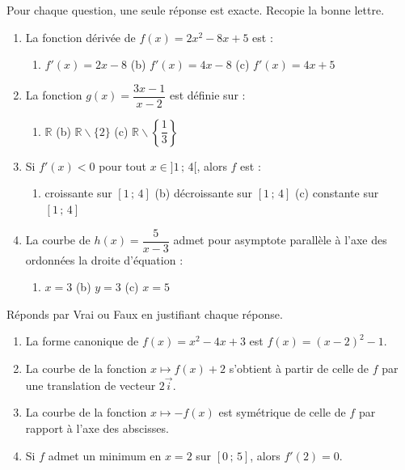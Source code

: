 \documentclass[11pt]{article}
\def\setminus{\mathbin{\backslash}}\let\smallsetminus\setminus
\begin{document}
\begin{exercice}
Pour chaque question, une seule réponse est exacte. Recopie la bonne lettre.
\begin{enumerate}
\item La fonction dérivée de $f(x)=2x^{2}-8x+5$ est :
\begin{enumerate}
\item[(a)] $f'(x)=2x-8$ \quad (b) $f'(x)=4x-8$ \quad (c) $f'(x)=4x+5$
\end{enumerate}
\item La fonction $g(x)=\dfrac{3x-1}{x-2}$ est définie sur :
\begin{enumerate}
\item[(a)] $\mathbb{R}$ \quad (b) $\mathbb{R}\setminus\{2\}$ \quad (c) $\mathbb{R}\setminus\left\{\dfrac{1}{3}\right\}$
\end{enumerate}
\item Si $f'(x)<0$ pour tout $x\in]1\,;\,4[$, alors $f$ est :
\begin{enumerate}
\item[(a)] croissante sur $[1\,;\,4]$ \quad (b) décroissante sur $[1\,;\,4]$ \quad (c) constante sur $[1\,;\,4]$
\end{enumerate}
\item La courbe de $h(x)=\dfrac{5}{x-3}$ admet pour asymptote parallèle à l'axe des ordonnées la droite d'équation :
\begin{enumerate}
\item[(a)] $x=3$ \quad (b) $y=3$ \quad (c) $x=5$
\end{enumerate}
\end{enumerate}
\end{exercice}

\begin{exercice}
Réponds par Vrai ou Faux en justifiant chaque réponse.
\begin{enumerate}
\item La forme canonique de $f(x)=x^{2}-4x+3$ est $f(x)=(x-2)^{2}-1$.
\item La courbe de la fonction $x\mapsto f(x)+2$ s'obtient à partir de celle de $f$ par une translation de vecteur $2\vec{i}$.
\item La courbe de la fonction $x\mapsto -f(x)$ est symétrique de celle de $f$ par rapport à l'axe des abscisses.
\item Si $f$ admet un minimum en $x=2$ sur $[0\,;\,5]$, alors $f'(2)=0$.
\end{enumerate}
\end{exercice}
\end{document}
